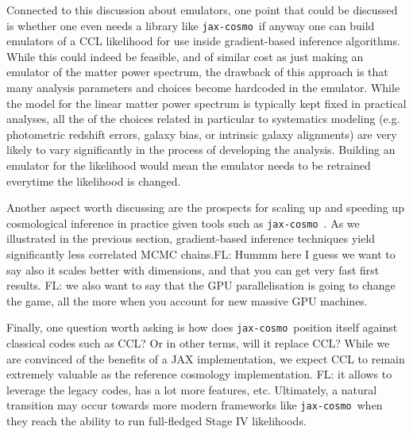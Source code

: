 \documentclass[twocolumn,twocolappendix,nofootinbib,iop]{openjournal}
\newcommand{\FrL}[1]{{\color{cyan}FL: #1}}
\newcommand{\jaxcosmo}{\texttt{jax-cosmo}}
\begin{document}
\bigskip

Connected to this discussion about emulators, one point that could be discussed is whether one even needs a library like \jaxcosmo\ if anyway one can build emulators of a CCL likelihood for use inside gradient-based inference algorithms. While this could indeed be feasible, and of similar cost as just making an emulator of the matter power spectrum, the drawback of this approach is that many analysis parameters and choices become hardcoded in the emulator. While the model for the linear matter power spectrum is typically kept fixed in practical analyses, all the of the choices related in particular to systematics modeling (e.g. photometric redshift errors, galaxy bias, or intrinsic galaxy alignments) are very likely to vary significantly in the process of developing the analysis. Building an emulator for the likelihood would mean the emulator needs to be retrained everytime the likelihood is changed.

\bigskip

Another aspect worth discussing are the prospects for scaling up and speeding up cosmological inference in practice given tools such as \jaxcosmo\ . As we illustrated in the previous section, gradient-based inference techniques yield significantly less correlated MCMC chains.\FrL{Hummm here I guess we want to say also it scales better with dimensions, and that you can get very fast first results.} \FrL{we also want to say that the GPU parallelisation is going to change the game, all the more when you account for new massive GPU machines.}


\bigskip

Finally, one question worth asking is how does \jaxcosmo\ position itself against classical codes such as CCL? Or in other terms, will it replace CCL? While we are convinced of the benefits of a JAX implementation, we expect CCL to remain extremely valuable as the reference cosmology implementation. \FrL{it allows to leverage the legacy codes, has a lot more features, etc.} Ultimately, a natural transition may occur towards more modern frameworks like \jaxcosmo\ when they reach the ability to run full-fledged Stage IV likelihoods.
\end{document}
